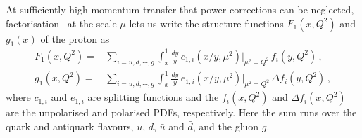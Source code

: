 At sufficiently high momentum transfer that power corrections can be neglected, factorisation~\cite{Sterman:1995fz} at the scale $\mu$ lets us write the structure functions $F_1(x,Q^2)$ and $g_1(x)$ of the proton as 
\begin{align}
F_1(x,Q^2) = {} & \sum_{i=u,d, \cdots, g} \int_x^1\frac{dy}{y}\, c_{1,i}(x/y,\mu^2)|_{\mu^2=Q^2}\, f_i(y,Q^2) \,,\\
g_1(x,Q^2) = {} & \sum_{i=u,d, \cdots, g} \int_x^1\frac{dy}{y}\, e_{1,i}(x/y,\mu^2)|_{\mu^2=Q^2}\, \Delta f_i(y,Q^2) \,,
\label{pdf}
\end{align}
where $c_{1,i}$ and $e_{1,i}$ are splitting functions and the $f_i(x,Q^2)$ and $\Delta f_i(x,Q^2)$ are the unpolarised and polarised PDFs, respectively. Here the sum runs over the quark and antiquark flavours, $u$, $d$, $\bar{u}$ and $\bar{d}$, and the gluon $g$.

